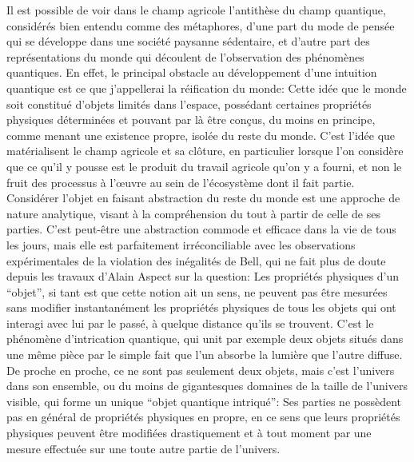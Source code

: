 Il est possible de voir dans le champ agricole l'antithèse du champ quantique,
considérés bien entendu comme des métaphores,
d'une part du mode de pensée qui se développe dans une société paysanne sédentaire,
et d'autre part des représentations du monde qui découlent de l'observation des phénomènes quantiques.
En effet,
le principal obstacle au développement d'une intuition quantique est ce que j'appellerai la réification du monde:
Cette idée que le monde soit constitué d'objets limités dans l'espace,
possédant certaines propriétés physiques déterminées et pouvant par là être conçus, du moins en principe,
comme menant une existence propre, isolée du reste du monde.
C'est l'idée que matérialisent le champ agricole et sa clôture,
en particulier lorsque l'on considère que ce qu'il y pousse est le produit du travail agricole qu'on y a fourni,
et non le fruit des processus à l'œuvre au sein de l'écosystème dont il fait partie.
Considérer l'objet en faisant abstraction du reste du monde est une approche de nature analytique,
visant à la compréhension du tout à partir de celle de ses parties.
C'est peut-être une abstraction commode et efficace dans la vie de tous les jours,
mais elle est parfaitement irréconciliable avec les observations expérimentales de la violation des inégalités de Bell,
qui ne fait plus de doute depuis les travaux d'Alain Aspect sur la question:
Les propriétés physiques d'un ``objet'', si tant est que cette notion ait un sens,
ne peuvent pas être mesurées sans modifier instantanément les propriétés physiques de tous les objets qui ont
interagi avec lui par le passé, à quelque distance qu'ils se trouvent.
C'est le phénomène d'intrication quantique,
qui unit par exemple deux objets situés dans une même pièce par le simple fait que l'un absorbe la lumière que l'autre
diffuse.
De proche en proche, ce ne sont pas seulement deux objets, mais c'est l'univers dans son ensemble,
ou du moins de gigantesques domaines de la taille de l'univers visible,
qui forme un unique ``objet quantique intriqué'':
Ses parties ne possèdent pas en général de propriétés physiques en propre,
en ce sens que leurs propriétés physiques peuvent être modifiées drastiquement et à tout moment
par une mesure effectuée sur une toute autre partie de l'univers.

